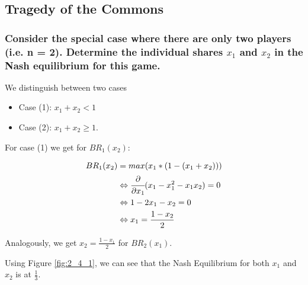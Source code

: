 
\subsection{Tragedy of the Commons}

\subsubsection{Consider the special case where there are only two players (i.e. n = 2). Determine the individual shares $x_1$ and $x_2$ in the Nash equilibrium for this game.}

We distinguish between two cases
\begin{itemize}
    \item Case (1): $x_1 + x_2 < 1$
    \item Case (2): $x_1 + x_2 \geq 1$.
\end{itemize} 
For case (1) we get for $BR_1(x_2)$:

\begin{equation}
    \begin{split}
        BR_1(x_2)&=max(x_1*(1 - (x_1 + x_2)))\\
        &\Leftrightarrow \cfrac{\partial}{\partial x_1}(x_1 - x_1^2 - x_1x_2)=0\\
        &\Leftrightarrow 1-2x_1-x_2=0\\
        &\Leftrightarrow x_1 = \frac{1-x_2}{2}\\
    \end{split}
\end{equation}

Analogously, we get $x_2 = \frac{1-x_1}{2}$ for $BR_2(x_1)$.

Using Figure \ref{fig:2_4_1}, we can see that the Nash Equilibrium for both $x_1$ and $x_2$ is at $\frac{1}{3}$.

